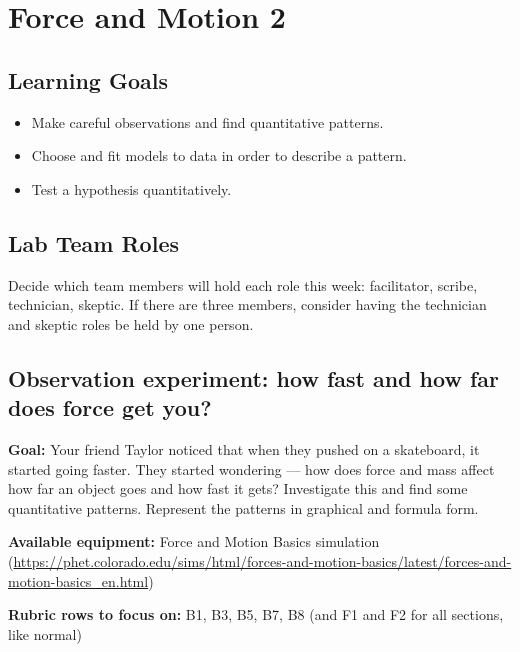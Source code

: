 \chapter{Force and Motion 2}

\section{Learning Goals}

\begin{itemize}
	\item Make careful observations and find quantitative patterns.
	
	\item Choose and fit models to data in order to describe a pattern.
	
	\item Test a hypothesis quantitatively.

\end{itemize}

\section{Lab Team Roles}

Decide which team members will hold each role this week: facilitator, scribe, technician, skeptic. If there are three members, consider having the technician and skeptic roles be held by one person.

\section{Observation experiment: how fast and how far does force get you?}\label{fm2:sec:obs}

\textbf{Goal:} Your friend Taylor noticed that when they pushed on a skateboard, it started going faster. They started wondering --- how does force and mass affect how far an object goes and how fast it gets? Investigate this and find some quantitative patterns. Represent the patterns in graphical and formula form.

\textbf{Available equipment:} Force and Motion Basics simulation (\url{https://phet.colorado.edu/sims/html/forces-and-motion-basics/latest/forces-and-motion-basics_en.html})

\textbf{Rubric rows to focus on:} B1, B3, B5, B7, B8 (and F1 and F2 for all sections, like normal)

